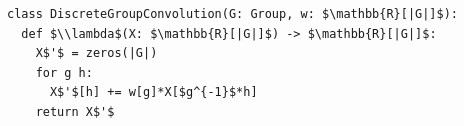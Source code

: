 \documentclass[border=10pt]{standalone}
\begin{document}
\begin{lstlisting}
class DiscreteGroupConvolution(G: Group, w: $\mathbb{R}[|G|]$):
  def $\\lambda$(X: $\mathbb{R}[|G|]$) -> $\mathbb{R}[|G|]$:
    X$'$ = zeros(|G|)
    for g h:
      X$'$[h] += w[g]*X[$g^{-1}$*h]
    return X$'$
\end{lstlisting}
\end{document}
